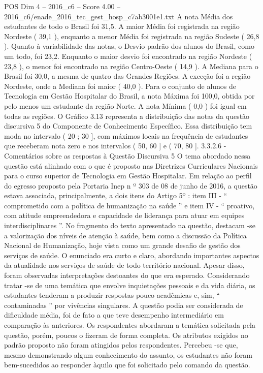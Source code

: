 \begin{textsample}{POS Dim 4 – 2016\_c6 – Score 4.00 – 2016\_c6/enade\_2016\_tec\_gest\_hosp\_c7ab3001e1.txt}
A nota Média dos estudantes de todo o Brasil foi 31,5.
A maior Média foi registrada na região Nordeste ( 39,1 ), enquanto a menor Média foi registrada na região Sudeste ( 26,8 ).
Quanto à variabilidade das notas, o Desvio padrão dos alunos do Brasil, como um todo, foi 23,2.
Enquanto o maior desvio foi encontrado na região Nordeste ( 23,8 ), o menor foi encontrado na região Centro-Oeste ( 14,9 ).
A Mediana para o Brasil foi 30,0, a mesma de quatro das Grandes Regiões.
A exceção foi a região Nordeste, onde a Mediana foi maior ( 40,0 ).
Para o conjunto de alunos de Tecnologia em Gestão Hospitalar do Brasil, a nota Máxima foi 100,0, obtida por pelo menos um estudante da região Norte.
A nota Mínima ( 0,0 ) foi igual em todas as regiões.
O Gráfico 3.13 representa a distribuição das notas da questão discursiva 5 do Componente de Conhecimento Específico.
Essa distribuição tem moda no intervalo ( 20 ; 30 ], com máximos locais na frequência de estudantes que receberam nota zero e nos intervalos ( 50, 60 ] e ( 70, 80 ]. 3.3.2.6 - Comentários sobre as respostas à Questão Discursiva 5 O tema abordado nessa questão está alinhado com o que é proposto nas Diretrizes Curriculares Nacionais para o curso superior de Tecnologia em Gestão Hospitalar.
Em relação ao perfil do egresso proposto pela Portaria Inep n º 303 de 08 de junho de 2016, a questão estava associada, principalmente, a dois itens do Artigo 5º : item III - “ comprometido com a política de humanização na saúde ” e item IV - “ proativo, com atitude empreendedora e capacidade de liderança para atuar em equipes interdisciplinares ”.
No fragmento do texto apresentado na questão, destacam -se a valorização dos níveis de atenção à saúde, bem como a discussão da Política Nacional de Humanização, hoje vista como um grande desafio de gestão dos serviços de saúde.
O enunciado era curto e claro, abordando importantes aspectos da atualidade nos serviços de saúde de todo território nacional.
Apesar disso, foram observadas interpretações destoantes do que era esperado.
Considerando tratar -se de uma temática que envolve inquietações pessoais e da vida diária, os estudantes tenderam a produzir respostas pouco acadêmicas e, sim, “ contaminadas ” por vivências singulares.
A questão podia ser considerada de dificuldade média, foi de fato a que teve desempenho intermediário em comparação às anteriores.
Os respondentes abordaram a temática solicitada pela questão, porém, poucos o fizeram de forma completa.
Os atributos exigidos no padrão proposto não foram atingidos pelos respondentes.
Percebeu -se que, mesmo demonstrando algum conhecimento do assunto, os estudantes não foram bem-sucedidos ao responder àquilo que foi solicitado pelo comando da questão.

\end{textsample}
